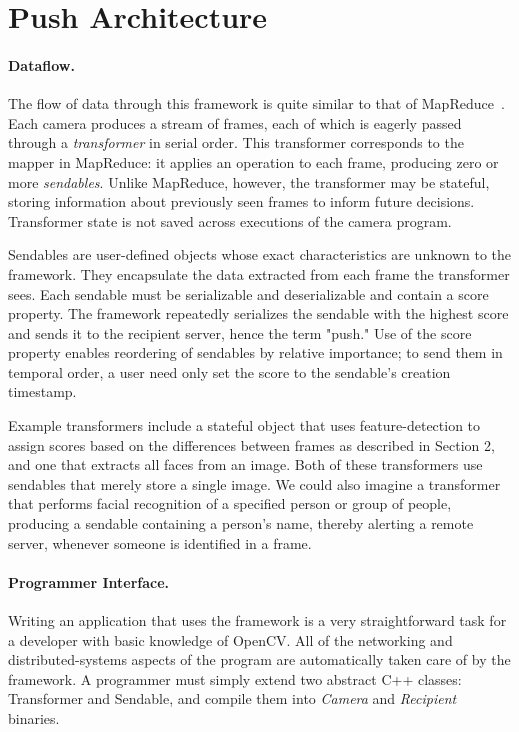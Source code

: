 \section{Push Architecture}

\paragraph{Dataflow.}

The flow of data through this framework is quite similar to that of MapReduce~\cite{mapreduce}.
Each camera produces a stream of frames, each of which is eagerly passed
through a \emph{transformer} in serial order.  This transformer corresponds to
the mapper in MapReduce: it applies an operation to each frame, producing
zero or more \emph{sendables}.  Unlike MapReduce, however, the transformer may be
stateful, storing information about previously seen frames to inform future decisions.
Transformer state is not saved across executions of the camera program.

Sendables are user-defined objects whose exact
characteristics are unknown to the framework.  They encapsulate the data extracted
from each frame the transformer sees.  Each sendable
must be serializable and deserializable and contain a score property.  The
framework repeatedly serializes the sendable with the highest score and sends
it to the recipient server, hence the term "push."  Use of the score property enables reordering of sendables
by relative importance; to send them in temporal order, a user need only set the
score to the sendable's creation timestamp.

Example transformers include a stateful object that uses feature-detection to assign scores
based on the differences between frames as described in Section 2, and
one that extracts all faces from an image.  Both of these transformers use sendables
that merely store a single image.  We could also imagine a transformer that performs facial recognition
of a specified person or group of people, producing a sendable containing a person's name, 
thereby alerting a remote server, whenever someone is identified in a frame.

\paragraph{Programmer Interface.}

Writing an application that uses the framework is a very straightforward
task for a developer with basic knowledge of OpenCV.  All of the
networking and distributed-systems aspects of the program are automatically
taken care of by the framework.  A programmer must simply extend two
abstract C++ classes: Transformer and Sendable, and compile them into
\emph{Camera} and \emph{Recipient} binaries.

